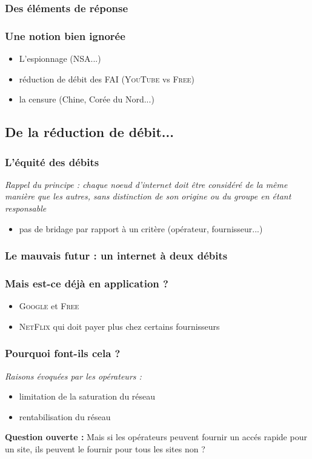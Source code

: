 \begin{frame}\frametitle{Des éléments de réponse}
\end{frame}


\begin{frame}\frametitle{Une notion bien ignorée}
    \begin{itemize}
        \item L'espionnage (\textsc{NSA}...)
        \item réduction de débit des FAI (\textsc{YouTube} vs \textsc{Free})
        \item la censure (Chine, Corée du Nord...)
    \end{itemize}
\end{frame}


\subsection{De la réduction de débit...}
\begin{frame}\frametitle{L'équité des débits}
    \emph{Rappel du principe : chaque noeud d'internet doit être considéré de
        la même manière que les autres, sans distinction de son origine ou du
    groupe en étant responsable}
    \begin{itemize}
        \item pas de bridage par rapport à un critère (opérateur, fournisseur...)
    \end{itemize}
\end{frame}


\begin{frame}\frametitle{Le mauvais futur : un internet à deux débits}
\end{frame}


\begin{frame}\frametitle{Mais est-ce déjà en application ?}
    \begin{itemize}
        \item \textsc{Google} et \textsc{Free}
        \item \textsc{NetFlix} qui doit payer plus chez certains fournisseurs
    \end{itemize}
\end{frame}


\begin{frame}\frametitle{Pourquoi font-ils cela ?}
    \emph{Raisons évoquées par les opérateurs :}
    \begin{itemize}
        \item limitation de la saturation du réseau
        \item rentabilisation du réseau\\
    \end{itemize}

    \textbf{Question ouverte : } Mais si les opérateurs peuvent fournir un
    accés rapide pour un site, ils peuvent le fournir pour tous les sites non ?
\end{frame}


